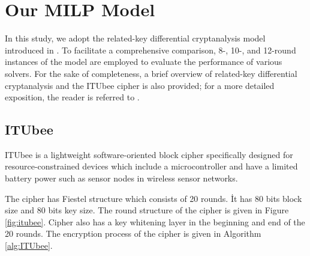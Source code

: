 \section{Our MILP Model}
In this study, we adopt the related-key differential cryptanalysis model introduced in \cite{halil2026milp}. To facilitate a comprehensive comparison, 8-, 10-, and 12-round instances of the model are employed to evaluate the performance of various solvers. For the sake of completeness, a brief overview of related-key differential cryptanalysis and the ITUbee cipher is also provided; for a more detailed exposition, the reader is referred to \cite{halil2026milp}.

\subsection{ITUbee}

ITUbee \cite{karakoc2013itubee} is a lightweight software-oriented block cipher specifically designed for resource-constrained devices which include a microcontroller and have a limited battery power such as sensor nodes in wireless sensor networks.

The cipher has Fiestel structure which consists of 20 rounds. İt has 80 bits block size and 80 bits key size. The round structure of the cipher is given in Figure \ref{fig:itubee}. Cipher also has a key whitening layer in the beginning and end of the 20 rounds. The encryption process of the cipher is given in Algorithm \ref{alg:ITUbee}. 

